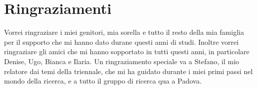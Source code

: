\documentclass[../main.tex]{subfiles}
\begin{document}
\chapter{Ringraziamenti}
\label{cap:ringraziamenti}

Vorrei ringraziare i miei genitori, mia sorella e tutto il resto della mia famiglia per il supporto che mi hanno dato durane questi anni di studi.
Inoltre vorrei ringraziare gli amici che mi hanno sopportato in tutti questi anni, in particolare Denise, Ugo, Bianca e Ilaria.
Un ringraziamento speciale va a Stefano, il mio relatore dai temi della triennale, che mi ha guidato durante i miei primi passi nel mondo della ricerca, e a tutto il gruppo di ricerca qua a Padova.
\end{document}

